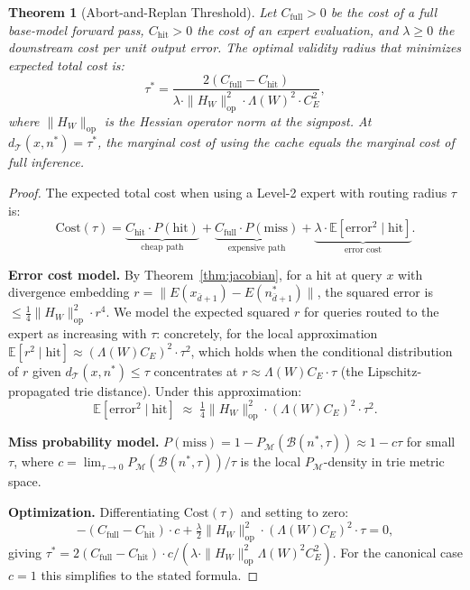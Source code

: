 \documentclass[11pt]{article}
\newtheorem{theorem}{Theorem}
\begin{document}
\begin{theorem}[Abort-and-Replan Threshold]
\label{thm:abort}
Let $C_{\mathrm{full}} > 0$ be the cost of a full base-model forward pass,
$C_{\mathrm{hit}} > 0$ the cost of an expert evaluation, and $\lambda \geq 0$
the downstream cost per unit output error.  The optimal validity radius that
minimizes expected total cost is:
\[
  \tau^* = \frac{2(C_{\mathrm{full}} - C_{\mathrm{hit}})}{\lambda \cdot
  \|H_W\|_{\mathrm{op}}^2 \cdot \Lambda(W)^2 \cdot C_E^2},
\]
where $\|H_W\|_{\mathrm{op}}$ is the Hessian operator norm at the signpost.
At $d_{\mathcal{T}}(x, n^*) = \tau^*$, the marginal cost of using the cache
equals the marginal cost of full inference.
\end{theorem}

\begin{proof}
The expected total cost when using a Level-2 expert with routing radius $\tau$ is:
\[
  \mathrm{Cost}(\tau) = \underbrace{C_{\mathrm{hit}} \cdot P(\text{hit})}_{
    \text{cheap path}} +
  \underbrace{C_{\mathrm{full}} \cdot P(\text{miss})}_{
    \text{expensive path}} +
  \underbrace{\lambda \cdot \mathbb{E}[\text{error}^2 \mid \text{hit}]}_{
    \text{error cost}}.
\]

\textbf{Error cost model.}  By Theorem~\ref{thm:jacobian}, for a hit at query $x$
with divergence embedding $r = \|E(x_{\bar{d}+1}) - E(n^*_{\bar{d}+1})\|$,
the squared error is $\leq \frac{1}{4}\|H_W\|_{\mathrm{op}}^2 \cdot r^4$.
We model the expected squared $r$ for queries routed to the expert as increasing
with $\tau$: concretely, for the local approximation $\mathbb{E}[r^2 \mid
\text{hit}] \approx (\Lambda(W) C_E)^2 \cdot \tau^2$, which holds when the
conditional distribution of $r$ given $d_{\mathcal{T}}(x, n^*) \leq \tau$
concentrates at $r \approx \Lambda(W) C_E \cdot \tau$ (the Lipschitz-propagated
trie distance).  Under this approximation:
\[
  \mathbb{E}[\text{error}^2 \mid \text{hit}]
  \;\approx\; \tfrac{1}{4}\|H_W\|_{\mathrm{op}}^2 \cdot (\Lambda(W) C_E)^2 \cdot \tau^2.
\]

\textbf{Miss probability model.}  $P(\text{miss}) = 1 - P_{\mathcal{M}}(\mathcal{B}(n^*, \tau))
\approx 1 - c\tau$ for small $\tau$, where $c = \lim_{\tau\to 0}
P_{\mathcal{M}}(\mathcal{B}(n^*, \tau))/\tau$ is the local $P_{\mathcal{M}}$-density
in trie metric space.

\textbf{Optimization.}  Differentiating $\mathrm{Cost}(\tau)$ and setting to zero:
\[
  -(C_{\mathrm{full}} - C_{\mathrm{hit}}) \cdot c
  + \tfrac{\lambda}{2}\|H_W\|_{\mathrm{op}}^2 \cdot (\Lambda(W) C_E)^2 \cdot \tau
  = 0,
\]
giving $\tau^* = 2(C_{\mathrm{full}} - C_{\mathrm{hit}}) \cdot c /
(\lambda \cdot \|H_W\|_{\mathrm{op}}^2 \Lambda(W)^2 C_E^2)$.  For the
canonical case $c = 1$ this simplifies to the stated formula.
\end{proof}
\end{document}
